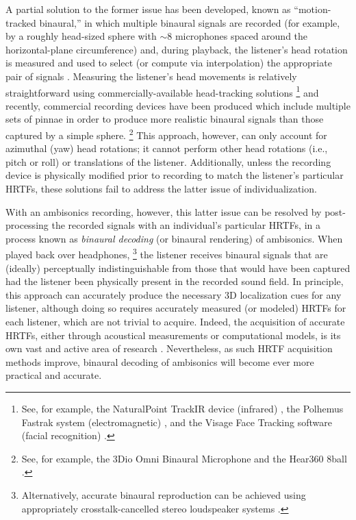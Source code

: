 A partial solution to the former issue has been developed, known as ``motion-tracked binaural,'' in which multiple binaural signals are recorded (for example, by a roughly head-sized sphere with $\sim8$ microphones spaced around the horizontal-plane circumference) and, during playback, the listener's head rotation is measured and used to select (or compute via interpolation) the appropriate pair of signals \citep{Algazi2004}.
Measuring the listener's head movements is relatively straightforward using commercially-available head-tracking solutions%
\footnote{See, for example, the NaturalPoint TrackIR device (infrared) \citep{TrackIRURL}, the Polhemus Fastrak system (electromagnetic) \citep{PolhemusURL}, and the Visage Face Tracking software (facial recognition) \citep{VisageURL}.} 
and recently, commercial recording devices have been produced which include multiple sets of pinnae in order to produce more realistic binaural signals than those captured by a simple sphere.%
\footnote{See, for example, the 3Dio Omni Binaural Microphone \citep{3DioOmniBinauralURL} and the Hear360 8ball \citep{Hear3608ballURL}.}
This approach, however, can only account for azimuthal (yaw) head rotations; it cannot perform other head rotations (i.e., pitch or roll) or translations of the listener.
Additionally, unless the recording device is physically modified prior to recording to match the listener's particular HRTFs, these solutions fail to address the latter issue of individualization.

With an ambisonics recording, however, this latter issue can be resolved by post-processing the recorded signals with an individual's particular HRTFs, in a process known as \textit{binaural decoding} (or binaural rendering) of ambisonics.
When played back over headphones,%
\footnote{Alternatively, accurate binaural reproduction can be achieved using appropriately crosstalk-cancelled stereo loudspeaker systems \citep{Choueiri2017a}.}
the listener receives binaural signals that are (ideally) perceptually indistinguishable from those that would have been captured had the listener been physically present in the recorded sound field.
In principle, this approach can accurately produce the necessary 3D localization cues for any listener, although doing so requires accurately measured (or modeled) HRTFs for each listener, which are not trivial to acquire.
Indeed, the acquisition of accurate HRTFs, either through acoustical measurements or computational models, is its own vast and active area of research \citep{Nicol2010,Xie2013}.
Nevertheless, as such HRTF acquisition methods improve, binaural decoding of ambisonics will become ever more practical and accurate.


